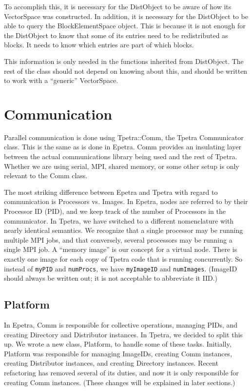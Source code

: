 \documentclass[10pt,relax]{TpetraDesign}
\begin{document}
To accomplish this, it is necessary for the DistObject to be aware of how its VectorSpace was constructed. In addition, it is necessary for the DistObject to be able to query the BlockElementSpace object. This is because it is not enough for the DistObject to know that some of its entries need to be redistributed as blocks. It needs to know which entries are part of which blocks.

This information is only needed in the functions inherited from DistObject. The rest of the class should not depend on knowing about this, and should be written to work with a ``generic'' VectorSpace.

%
\section{Communication}
Parallel communication is done using Tpetra::Comm, the Tpetra Communicator class. This is the same as is done in Epetra. Comm provides an insulating layer between the actual communications library being used and the rest of Tpetra. Whether we are using serial, MPI, shared memory, or some other setup is only relevant to the Comm class. 

The most striking difference between Epetra and Tpetra with regard to communication is Processors vs. Images. In Epetra, nodes are referred to by their Processor ID (PID), and we keep track of the number of Processors in the communicator. In Tpetra, we have switched to a different nomenclature with nearly identical semantics. We recognize that a single processor may be running multiple MPI jobs, and that conversely, several processors may be running a single MPI job. A ``memory image'' is our concept for a virtual node. There is exactly one image for each copy of Tpetra code that is running concurrently. So instead of \texttt{myPID} and \texttt{numProcs}, we have \texttt{myImageID} and \texttt{numImages}. (ImageID should always be written out; it is not acceptable to abbreviate it IID.)

%
\subsection{Platform}
In Epetra, Comm is responsible for collective operations, managing PIDs, and creating Directory and Distributor instances. In Tpetra, we decided to split this up. We wrote a new class, Platform, to handle some of these tasks. Initially, Platform was responsible for managing ImageIDs, creating Comm instances, creating Distributor instances, and creating Directory instances. Recent refactoring has removed several of its duties, and now it is only responsible for creating Comm instances. (These changes will be explained in later sections.)
\end{document}
